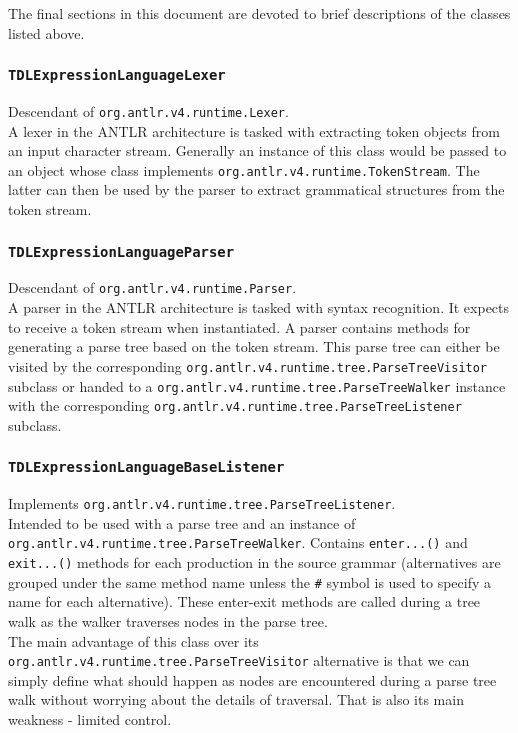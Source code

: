 \documentclass[12pt,oneside,a4paper,notitlepage]{report}
\begin{document}
	\par The final sections in this document are devoted to brief descriptions of the classes listed above.


	\subsubsection*{\texttt{TDLExpressionLanguageLexer}}
	\par Descendant of \texttt{org.antlr.v4.runtime.Lexer}. \\ A lexer in the ANTLR architecture is tasked with extracting token objects from an input character stream. Generally an instance of this class would be passed to an object whose class implements \texttt{org.antlr.v4.runtime.TokenStream}. The latter can then be used by the parser to extract grammatical structures from the token stream.

	\subsubsection*{\texttt{TDLExpressionLanguageParser}}
	\par Descendant of \texttt{org.antlr.v4.runtime.Parser}. \\ A parser in the ANTLR architecture is tasked with syntax recognition. It expects to receive a token stream when instantiated. A parser contains methods for generating a parse tree based on the token stream. This parse tree can either be visited by the corresponding \texttt{org.antlr.v4.runtime.tree.ParseTreeVisitor} subclass or handed to a \texttt{org.antlr.v4.runtime.tree.ParseTreeWalker} instance with the corresponding \texttt{org.antlr.v4.runtime.tree.ParseTreeListener} subclass.

	\subsubsection*{\texttt{TDLExpressionLanguageBaseListener}}
	\par Implements \texttt{org.antlr.v4.runtime.tree.ParseTreeListener}. \\ Intended to be used with a parse tree and an instance of \\ \texttt{org.antlr.v4.runtime.tree.ParseTreeWalker}. Contains \texttt{enter...()} and \texttt{exit...()} methods for each production in the source grammar (alternatives are grouped under the same method name unless the \texttt{\#} symbol is used to specify a name for each alternative). These enter-exit methods are called during a tree walk as the walker traverses nodes in the parse tree. \\ The main advantage of this class over its \\ \texttt{org.antlr.v4.runtime.tree.ParseTreeVisitor} alternative is that we can simply define what should happen as nodes are encountered during a parse tree walk without worrying about the details of traversal. That is also its main weakness - limited control.
\end{document}
